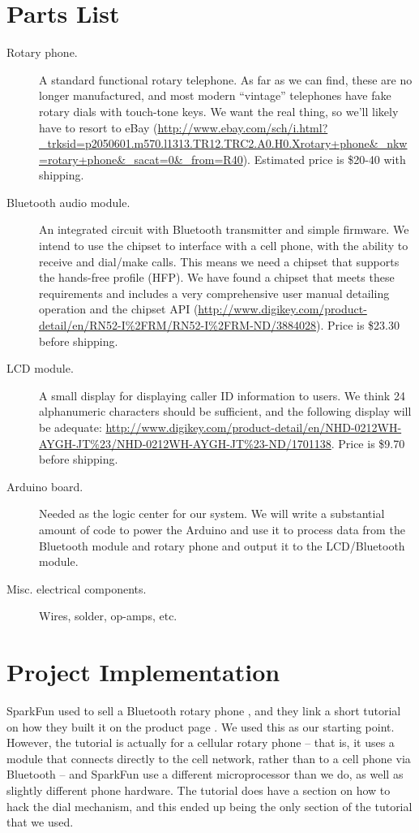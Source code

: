\documentclass{es50report}
\begin{document}
    \section{Parts List}
        \begin{description}
            \item[Rotary phone.] A standard functional rotary telephone. As far as we can find, these are no longer manufactured, and most modern ``vintage'' telephones have fake rotary dials with touch-tone keys. We want the real thing, so we'll likely have to resort to eBay (\url{http://www.ebay.com/sch/i.html?_trksid=p2050601.m570.l1313.TR12.TRC2.A0.H0.Xrotary+phone&_nkw=rotary+phone&_sacat=0&_from=R40}). Estimated price is \$20-40 with shipping.
            \item[Bluetooth audio module.] An integrated circuit with Bluetooth transmitter and simple firmware. We intend to use the chipset to interface with a cell phone, with the ability to receive and dial/make calls. This means we need a chipset that supports the hands-free profile (HFP). We have found a chipset that meets these requirements and includes a very comprehensive user manual detailing operation and the chipset API (\url{http://www.digikey.com/product-detail/en/RN52-I%2FRM/RN52-I%2FRM-ND/3884028}). Price is \$23.30 before shipping.
            \item[LCD module.] A small display for displaying caller ID information to users. We think 24 alphanumeric characters should be sufficient, and the following display will be adequate: \url{http://www.digikey.com/product-detail/en/NHD-0212WH-AYGH-JT%23/NHD-0212WH-AYGH-JT%23-ND/1701138}. Price is \$9.70 before shipping.
            \item[Arduino board.] Needed as the logic center for our system. We will write a substantial amount of code to power the Arduino and use it to process data from the Bluetooth module and rotary phone and output it to the LCD/Bluetooth module.
            \item[Misc. electrical components.] Wires, solder, op-amps, etc.
        \end{description}

    \section{Project Implementation}
    SparkFun used to sell a Bluetooth rotary phone \cite{sparkfun14}, and they link a short tutorial on how they built it on the product page \cite{seidle05}. We used this as our starting point. However, the tutorial is actually for a cellular rotary phone -- that is, it uses a module that connects directly to the cell network, rather than to a cell phone via Bluetooth -- and SparkFun use a different microprocessor than we do, as well as slightly different phone hardware. The tutorial does have a section on how to hack the dial mechanism, and this ended up being the only section of the tutorial that we used.
\end{document}
